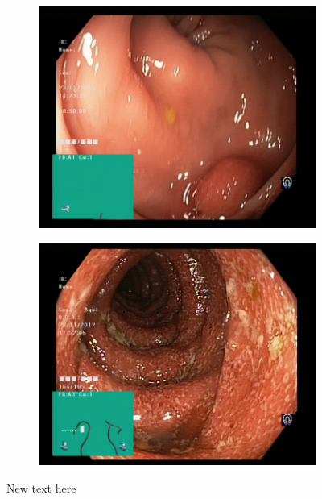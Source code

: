 \begin{figure}[h!]
\begin{subfigure}[b]{0.4\textwidth}
            \caption[Hate to be this guy]%
            {{\small }}    
            \label{fig:polypGAN}
        \end{subfigure}
        \qquad\vfill%
        \begin{subfigure}[b]{0.4\textwidth}   
            \centering 
            \includegraphics[width=\textwidth]{experiments/images/polyps.jpg}
            \caption[]%
            {{\small }}    
            \label{fig:zAE}
        \end{subfigure}
        \qquad%
        \begin{subfigure}[b]{0.4\textwidth}   
            \centering 
            \includegraphics[width=\textwidth]{experiments/images/ulcerative-colitis.jpg}
            \caption[]%
            {{\small }}    
            \label{fig:zGAN}
        \end{subfigure}
        \caption[ ]
        {\small New text here} 
        \label{fig:GC1GREEN}
    \end{figure}
    
